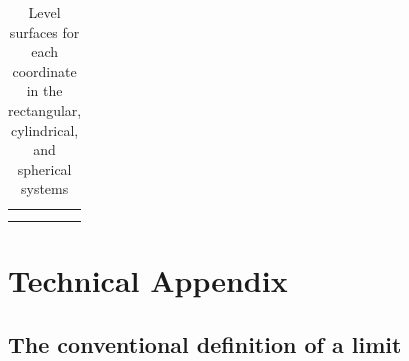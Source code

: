 \documentclass{watsonbook}
\begin{document}
\vspace{12pt}

\begin{table}[h!]
  \centering
  \begin{tabular}{M{4.2cm}|M{4.2cm}|M{4.2cm}}
    \usebox{\xconstantfig} & \usebox{\yconstantfig} & \usebox{\zconstantfig}  \\ \hline
    \usebox{\rconstantfig} & \usebox{\thetaconstantfig}  & \usebox{\zconstantfig}  \\ \hline
    \usebox{\rhoconstantfig} & \usebox{\thetaconstantfig}  & \usebox{\phiconstantfig}  \\ \hline
  \end{tabular}
  \caption{Level surfaces for each coordinate
    in the rectangular, cylindrical, and spherical
    systems \label{table:coordinateslices}}
\end{table}

\newpage

\section{Technical Appendix}

\subsection{The conventional definition of a limit}
\label{sec:limitappendix}
\end{document}
